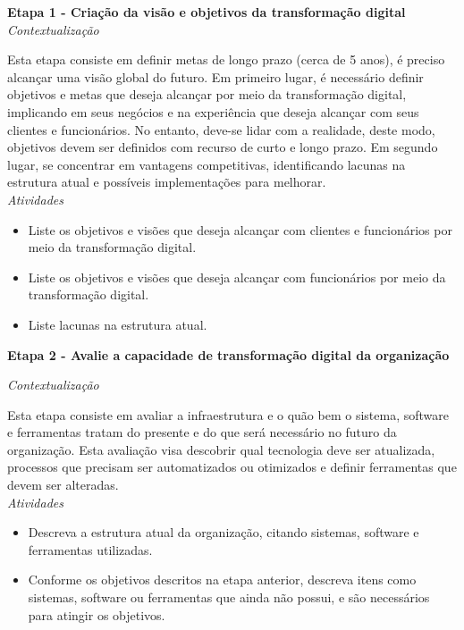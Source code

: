 \textbf{Etapa 1 - Criação da visão e objetivos da transformação digital}\\

\textit{Contextualização}

Esta etapa consiste em definir metas de longo prazo (cerca de 5 anos), é preciso alcançar uma visão global do futuro.
Em primeiro lugar, é necessário definir objetivos e metas que deseja alcançar por meio da transformação digital, implicando em seus negócios e na experiência que deseja alcançar com seus clientes e funcionários. No entanto, deve-se lidar com a realidade, deste modo, objetivos devem ser definidos com recurso de curto e longo prazo. Em segundo lugar, se concentrar em vantagens competitivas, identificando lacunas na estrutura atual e possíveis implementações para melhorar.\\

\textit{Atividades}
\begin{itemize}
    \item Liste os objetivos e visões que deseja alcançar com clientes e funcionários por meio da transformação digital.
    
    \item Liste os objetivos e visões que deseja alcançar com funcionários por meio da transformação digital.
    
    \item Liste lacunas na estrutura atual.
\end{itemize}


\textbf{Etapa 2 - Avalie a capacidade de transformação digital da organização}

\textit{Contextualização}

Esta etapa consiste em avaliar a infraestrutura e o quão bem o sistema, software e ferramentas tratam do presente e do que será necessário no futuro da organização. Esta avaliação visa descobrir qual tecnologia deve ser atualizada, processos que precisam ser automatizados ou otimizados e definir ferramentas que devem ser alteradas.\\

\textit{Atividades}
\begin{itemize}
    \item Descreva a estrutura atual da organização, citando sistemas, software e ferramentas utilizadas.

    \item Conforme os objetivos descritos na etapa anterior, descreva itens como sistemas, software ou ferramentas que ainda não possui, e são necessários para atingir os objetivos.
\end{itemize}

